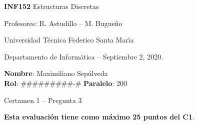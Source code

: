 \documentclass[legalpaper,10pt]{article}
\begin{document}
\thispagestyle{empty}

\begin{minipage}[t]{0.6\textwidth}

{\LARGE \textbf{INF152} Estructuras Discretas}

{\large Profesores: R. Astudillo -- M. Bugueño}

Universidad Técnica Federico Santa Mar\'{\i}a

Departamento de Informática -- Septiembre 2, 2020.

\end{minipage}
\hfill
\begin{minipage}[t]{0.35\textwidth}
\textbf{Nombre}: Maximiliano Sepúlveda \\[0.3cm]
\textbf{Rol}: #########-# \textbf{Paralelo}: 200
\end{minipage}

\vspace{0.8cm}

{\Large Certamen 1 -- Pregunta 3}

\vspace{0.4cm}

\textbf{Esta evaluación tiene como máximo 25 puntos del C1}.
\end{document}
